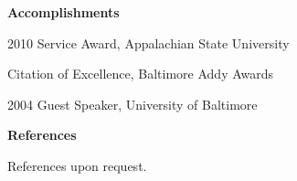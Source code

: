 \documentclass[a4paper,12pt,final]{memoir}
\newcommand{\Sep}{\vspace{1.5em}}
\newcommand{\SmallSep}{\vspace{0.5em}}
\newcommand{\CVSection}[1]
	{\Large\textbf{#1}\par
	\SmallSep\normalsize\normalfont}
\begin{document}
\CVSection{Accomplishments}
\begin{compactitem}[\color{BrickRed}$\circ$]
	\item 2010 Service Award, Appalachian State University
	\item Citation of Excellence, Baltimore Addy Awards
	\item 2004 Guest Speaker, University of Baltimore
\end{compactitem}
\Sep

\CVSection{References}
References upon request.

\end{document}
